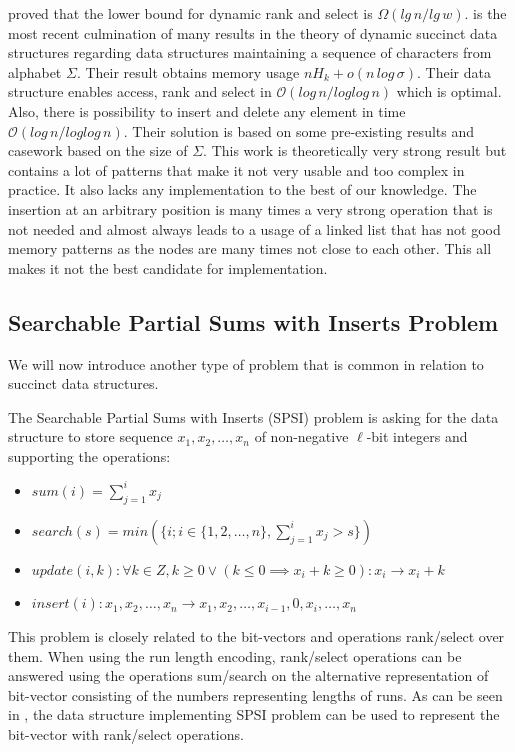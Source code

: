 \cite{beame2002optimal} proved that the lower bound for dynamic rank and select is $\Omega(lg\,n/lg\,w)$. \cite{munro2015compressed} is the most recent culmination of many results in the theory of dynamic succinct data structures regarding data structures maintaining a sequence of characters from alphabet $\Sigma$. Their result obtains memory usage $nH_k+o(n\,log\,\sigma)$. Their data structure enables access, rank and select in $\mathcal{O}(log\,n/log log\,n)$ which is optimal. Also, there is possibility to insert and delete any element in time $\mathcal{O}(log\,n/log log\,n)$. Their solution is based on some pre-existing results and casework based on the size of $\Sigma$. This work is theoretically very strong result but contains a lot of patterns that make it not very usable and too complex in practice. It also lacks any implementation to the best of our knowledge. The insertion at an arbitrary position is many times a very strong operation that is not needed and almost always leads to a usage of a linked list that has not good memory patterns as the nodes are many times not close to each other. This all makes it not the best candidate for implementation.

\subsection{Searchable Partial Sums with Inserts Problem}

We will now introduce another type of problem that is common in relation to succinct data structures.

\begin{definition}
The Searchable Partial Sums with Inserts (SPSI) problem is asking for the data structure to
store sequence $x_1, x_2, \ldots , x_n$ of non-negative $\ell$-bit integers and supporting the operations:
\begin{itemize}
    \item $sum(i) = \sum_{j=1}^{i} x_j$
    \item $search(s) = min(\{i; i\in \{1, 2,\ldots, n\}, \sum_{j=1}^{i} x_j > s \})$
    \item $update(i, k): \forall k \in Z, k \geq 0 \lor (k\leq 0 \implies x_i + k \geq 0): x_i \rightarrow x_i + k$
    \item $insert(i): x_1, x_2,\ldots, x_n \rightarrow x_1, x_2,\ldots , x_{i-1}, 0, x_{i}, \ldots , x_n$
\end{itemize}
\end{definition}

This problem is closely related to the bit-vectors and operations rank/select over them. When using the run length encoding, rank/select operations can be answered using the operations sum/search on the alternative representation of bit-vector consisting of the numbers representing lengths of runs. As can be seen in \cite{prezza2017framework}, the data structure implementing SPSI problem can be used to represent the bit-vector with rank/select operations.

